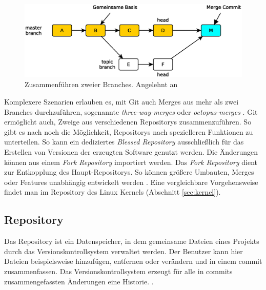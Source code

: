 \begin{figure}[hb]
  \centering
  \includegraphics[scale=0.60]{images/merge.eps}
  \caption{Zusammenführen zweier Branches. Angelehnt an \cite[83]{gitosp}}
  \label{fig:merge}
\end{figure}

Komplexere Szenarien erlauben es, mit Git auch Merges aus mehr als zwei
Branches durchzuführen, sogenannte \textit{three-way-merges} oder
\textit{octopus-merges} \cite[S.~87]{gitosp}. Git ermöglicht auch, Zweige aus
verschiedenen Repositorys zusammenzuführen. So gibt es nach \cite[3]{gitwf}
noch die Möglichkeit, Repositorys nach spezielleren Funktionen zu unterteilen.
So kann ein dediziertes \textit{Blessed Repository} ausschließlich für das
Erstellen von Versionen der erzeugten Software genutzt werden. Die Änderungen
können aus einem \textit{Fork Repository} importiert werden. Das \textit{Fork
Repository} dient zur Entkopplung des Haupt-Repositorys. So können größere
Umbauten, Merges oder Features unabhängig entwickelt werden
\cite[S.~123]{gitwf}. Eine vergleichbare Vorgehensweise findet man im
Repository des Linux Kernels \cite{link:linuxgit} (Abschnitt \ref{sec:kernel}).

\subsection{Repository}\label{sec:repository}
Das Repository ist ein Datenspeicher, in dem gemeinsame Dateien eines Projekts
durch das Versionskontrollsystem verwaltet werden. Der Benutzer kann hier Dateien
beispielsweise hinzufügen, entfernen oder verändern und in einem
\gls{commit} zusammenfassen. Das Versionskontrollsystem erzeugt für alle in
\glspl{commit} zusammengefassten Änderungen eine Historie.
 \cite[S.~38]{hagen:1678}.

